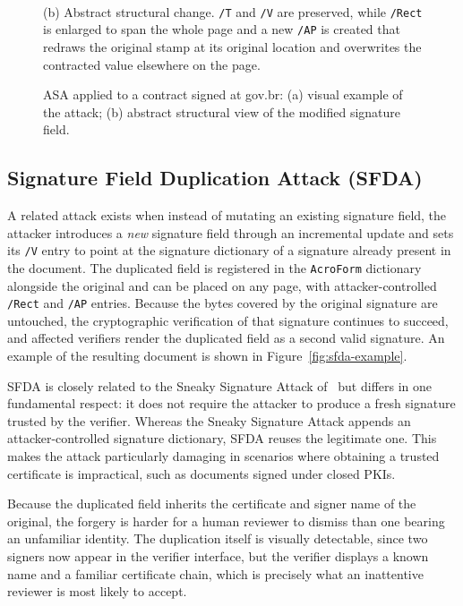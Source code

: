 \documentclass[12pt]{article}
\begin{document}
\begin{figure}[htb]
\begin{minipage}{\linewidth}
\\[3pt]
		{\footnotesize (b) Abstract structural change. \texttt{/T} and \texttt{/V} are preserved, while \texttt{/Rect} is enlarged to span the whole page and a new \texttt{/AP} is created that redraws the original stamp at its original location and overwrites the contracted value elsewhere on the page.}
	\end{minipage}
	\caption{ASA applied to a contract signed at gov.br: (a) visual example of the attack; (b) abstract structural view of the modified signature field.\label{fig:rect-ap-abuse}}
\end{figure}


\subsection{Signature Field Duplication Attack (SFDA)}

A related attack exists when instead of mutating an existing signature field, the attacker introduces a \emph{new} signature field through an incremental update and sets its \texttt{/V} entry to point at the signature dictionary of a signature already present in the document. The duplicated field is registered in the \texttt{AcroForm} dictionary alongside the original and can be placed on any page, with attacker-controlled \texttt{/Rect} and \texttt{/AP} entries. Because the bytes covered by the original signature are untouched, the cryptographic verification of that signature continues to succeed, and affected verifiers render the duplicated field as a second valid signature. An example of the resulting document is shown in Figure~\ref{fig:sfda-example}.

SFDA is closely related to the Sneaky Signature Attack of~\cite{pdf-certification-attack} but differs in one fundamental respect: it does not require the attacker to produce a fresh signature trusted by the verifier. Whereas the Sneaky Signature Attack appends an attacker-controlled signature dictionary, SFDA reuses the legitimate one. This makes the attack particularly damaging in scenarios where obtaining a trusted certificate is impractical, such as documents signed under closed PKIs.

Because the duplicated field inherits the certificate and signer name of the original, the forgery is harder for a human reviewer to dismiss than one bearing an unfamiliar identity. The duplication itself is visually detectable, since two signers now appear in the verifier interface, but the verifier displays a known name and a familiar certificate chain, which is precisely what an inattentive reviewer is most likely to accept.
\end{document}
